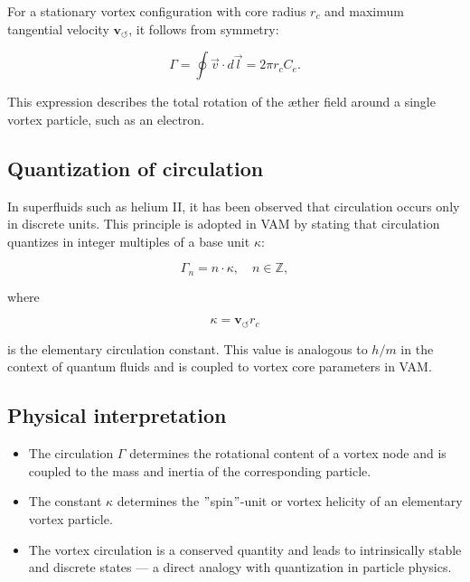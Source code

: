 \documentclass[preprint]{revtex4-2}
\begin{document}
For a stationary vortex configuration with core radius \( r_c \) and maximum tangential velocity \( \mathbf{v}_{\scriptscriptstyle\boldsymbol{\circlearrowleft}} \), it follows from symmetry:

\begin{equation}
    \Gamma = \oint \vec{v} \cdot d\vec{l} = 2\pi r_c C_e.
\end{equation}

This expression describes the total rotation of the æther field around a single vortex particle, such as an electron.

\subsection{Quantization of circulation}

In superfluids such as helium II, it has been observed that circulation occurs only in discrete units. This principle is adopted in VAM by stating that circulation quantizes in integer multiples of a base unit \( \kappa \):

\begin{equation}
    \Gamma_n = n \cdot \kappa, \quad n \in \mathbb{Z},
\end{equation}

where

\begin{equation}
    \kappa = \mathbf{v}_{\scriptscriptstyle\boldsymbol{\circlearrowleft}} r_c
\end{equation}

is the elementary circulation constant. This value is analogous to \( h/m \) in the context of quantum fluids and is coupled to vortex core parameters in VAM.

\subsection{Physical interpretation}

\begin{itemize}
    \item The circulation \( \Gamma \) determines the rotational content of a vortex node and is coupled to the mass and inertia of the corresponding particle.

    \item The constant \( \kappa \) determines the \("\)spin\("\)-unit or vortex helicity of an elementary vortex particle.
    \item The vortex circulation is a conserved quantity and leads to intrinsically stable and discrete states — a direct analogy with quantization in particle physics.
\end{itemize}
\end{document}
